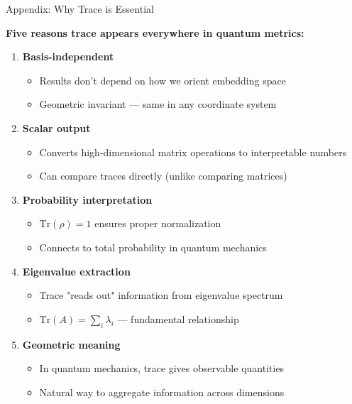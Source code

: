 \documentclass[aspectratio=169,11pt]{beamer}
\begin{document}
\begin{frame}{Appendix: Why Trace is Essential}

\textbf{Five reasons trace appears everywhere in quantum metrics:}

\vspace{0.5em}

\begin{enumerate}
  \item \textbf{Basis-independent}
  \begin{itemize}
    \item Results don't depend on how we orient embedding space
    \item Geometric invariant — same in any coordinate system
  \end{itemize}

  \vspace{0.3em}

  \item \textbf{Scalar output}
  \begin{itemize}
    \item Converts high-dimensional matrix operations to interpretable numbers
    \item Can compare traces directly (unlike comparing matrices)
  \end{itemize}

  \vspace{0.3em}

  \item \textbf{Probability interpretation}
  \begin{itemize}
    \item $\text{Tr}(\rho) = 1$ ensures proper normalization
    \item Connects to total probability in quantum mechanics
  \end{itemize}

  \vspace{0.3em}

  \item \textbf{Eigenvalue extraction}
  \begin{itemize}
    \item Trace "reads out" information from eigenvalue spectrum
    \item $\text{Tr}(A) = \sum_i \lambda_i$ — fundamental relationship
  \end{itemize}

  \vspace{0.3em}

  \item \textbf{Geometric meaning}
  \begin{itemize}
    \item In quantum mechanics, trace gives observable quantities
    \item Natural way to aggregate information across dimensions
  \end{itemize}
\end{enumerate}

\end{frame}
\end{document}
